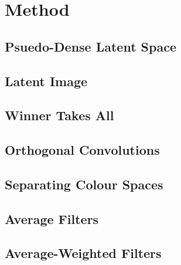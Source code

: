 \chapter{Method}

\label{ch:method}

\section{Psuedo-Dense Latent Space}

\section{Latent Image}

\section{Winner Takes All}

\section{Orthogonal Convolutions}

\section{Separating Colour Spaces}

\section{Average Filters}

\section{Average-Weighted Filters}
